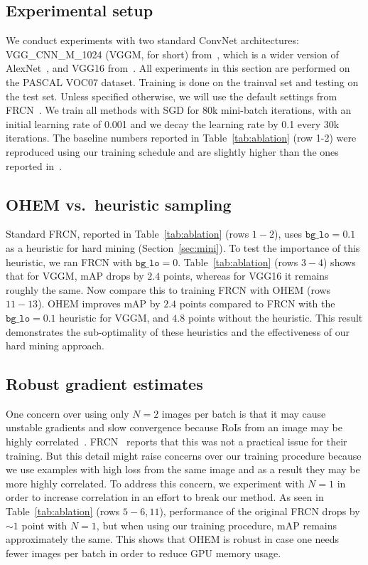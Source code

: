 \documentclass[10pt,twocolumn,letterpaper]{article}
\begin{document}
\vspace{-0.01in}
\subsection{Experimental setup}\label{sec:expsetup}
\vspace{-0.03in}
We conduct experiments with two standard ConvNet architectures: VGG\_CNN\_M\_1024 (VGGM, for short) from~\cite{Chatfield14}, which is a wider version of AlexNet~\cite{AlexNet}, and VGG16 from~\cite{VGG}. All experiments in this section are performed on the PASCAL VOC07 dataset. Training is done on the trainval set and testing on the test set. Unless specified otherwise, we will use the default settings from FRCN~\cite{frcn}. We train all methods with SGD for 80k mini-batch iterations, with an initial learning rate of 0.001 and we decay the learning rate by 0.1 every 30k iterations. The baseline numbers reported in Table~\ref{tab:ablation} (row 1-2) were reproduced using our training schedule and are slightly higher than the ones reported in~\cite{frcn}.

\subsection{OHEM vs.\ heuristic sampling}\label{sec:bglo}
\vspace{-0.03in}
Standard FRCN, reported in Table~\ref{tab:ablation} (rows $1-2$), uses $\texttt{bg\_lo}=0.1$ as a heuristic for hard mining (Section~\ref{sec:mini}). To test the importance of this heuristic, we ran FRCN with $\texttt{bg\_lo}=0$. Table~\ref{tab:ablation} (rows $3-4$) shows that for VGGM, mAP drops by $2.4$ points, whereas for VGG16 it remains roughly the same. Now compare this to training FRCN with OHEM (rows $11-13$). OHEM improves mAP by $2.4$ points compared to FRCN with the $\texttt{bg\_lo}=0.1$ heuristic for VGGM, and $4.8$ points without the heuristic. This result demonstrates the sub-optimality of these heuristics and the effectiveness of our hard mining approach.

\subsection{Robust gradient estimates}\label{sec:fewer}
\vspace{-0.03in}
One concern over using only $N=2$ images per batch is that it may cause unstable gradients and slow convergence because RoIs from an image may be highly correlated~\cite{minibatchSVM}. FRCN~\cite{frcn} reports that this was not a practical issue for their training. But this detail might raise concerns over our training procedure because we use examples with high loss from the same image and as a result they may be more highly correlated. To address this concern, we experiment with $N=1$ in order to increase correlation in an effort to break our method. As seen in Table~\ref{tab:ablation} (rows $5-6,11$), performance of the original FRCN drops by ${\sim}1$ point with $N=1$, but when using our training procedure, mAP remains approximately the same. This shows that OHEM is robust in case one needs fewer images per batch in order to reduce GPU memory usage.
\end{document}
